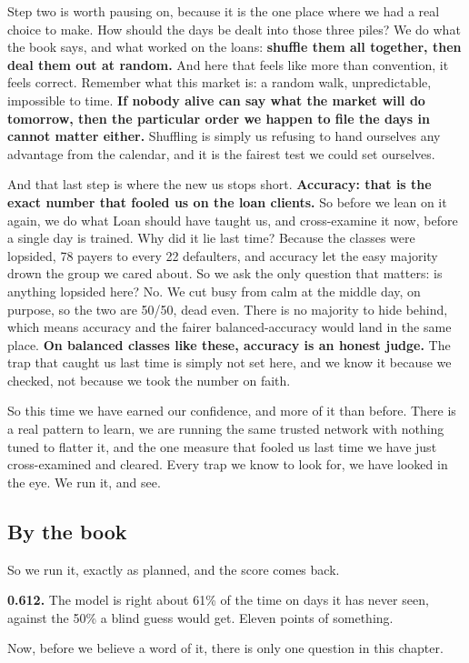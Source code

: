 \documentclass[11pt]{article} %
\begin{document}
Step two is worth pausing on, because it is the one place where we had a real choice to make. How should the days be dealt into those three piles? We do what the book says, and what worked on the loans: \textbf{shuffle them all together, then deal them out at random.} And here that feels like more than convention, it feels correct. Remember what this market is: a random walk, unpredictable, impossible to time. \textbf{If nobody alive can say what the market will do tomorrow, then the particular order we happen to file the days in cannot matter either.} Shuffling is simply us refusing to hand ourselves any advantage from the calendar, and it is the fairest test we could set ourselves.

And that last step is where the new us stops short. \textbf{Accuracy: that is the exact number that fooled us on the loan clients.} So before we lean on it again, we do what Loan should have taught us, and cross-examine it now, before a single day is trained. Why did it lie last time? Because the classes were lopsided, 78 payers to every 22 defaulters, and accuracy let the easy majority drown the group we cared about. So we ask the only question that matters: is anything lopsided here? No. We cut busy from calm at the middle day, on purpose, so the two are 50/50, dead even. There is no majority to hide behind, which means accuracy and the fairer balanced-accuracy would land in the same place. \textbf{On balanced classes like these, accuracy is an honest judge.} The trap that caught us last time is simply not set here, and we know it because we checked, not because we took the number on faith.

So this time we have earned our confidence, and more of it than before. There is a real pattern to learn, we are running the same trusted network with nothing tuned to flatter it, and the one measure that fooled us last time we have just cross-examined and cleared. Every trap we know to look for, we have looked in the eye. We run it, and see.


\subsection{By the book}


So we run it, exactly as planned, and the score comes back.

\textbf{0.612.} The model is right about 61\% of the time on days it has never seen, against the 50\% a blind guess would get. Eleven points of something.

Now, before we believe a word of it, there is only one question in this chapter.
\end{document}
